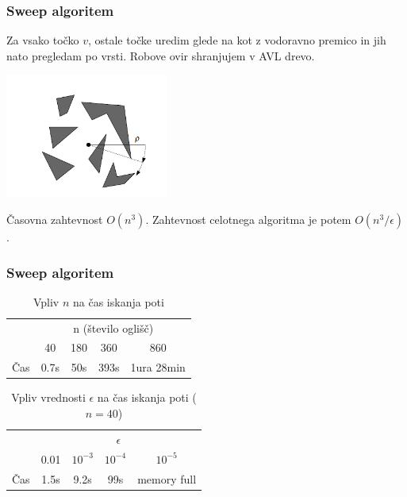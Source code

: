 \documentclass{beamer}
\begin{document}
\begin{frame}
    \frametitle{Sweep algoritem}
    
    Za vsako točko $v$, ostale točke uredim glede na kot z vodoravno premico in jih nato pregledam po vrsti. Robove ovir shranjujem v AVL drevo.

    \pause

    \includegraphics[width=0.4\textwidth]{sweep.png}

    \pause

    Časovna zahtevnost $O(n^3)$. Zahtevnost celotnega algoritma je potem  $O(n^3/\epsilon)$.

    
\end{frame}

\begin{frame}
    \frametitle{Sweep algoritem}
    \begin{table}[h]
        \centering
        \begin{tabular}{|c|c|c|c|c|}
            \hline
            & \multicolumn{4}{c|}{n (število oglišč)} \\
            \cline{2-5}
            & 40 & 180 & 360 & 860 \\
            \hline
            Čas & 0.7s & 50s &  393s &  1ura 28min\\
            \hline
        \end{tabular}
        \caption{Vpliv $n$ na čas iskanja poti}

    \end{table}
   
    \begin{table}[h]
        \centering
        \begin{tabular}{|c|c|c|c|c|}
            \hline
            & \multicolumn{4}{c|}{$\epsilon$} \\
            \cline{2-5}
            & 0.01 & $10^{-3}$ & $10^{-4}$ & $10^{-5}$ \\
            \hline
            Čas & 1.5s & 9.2s & 99s  &  memory full \\
            \hline
           
        \end{tabular}
        \caption{Vpliv vrednosti $\epsilon$ na čas iskanja poti ($n = 40$)}
    \end{table}
\end{frame}
\end{document}
